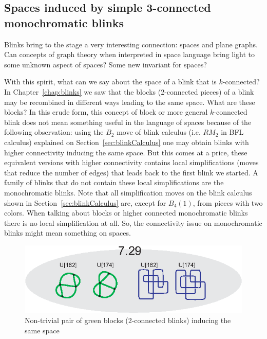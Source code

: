 \subsection{Spaces induced by simple 3-connected monochromatic blinks}

Blinks bring to the stage a very interesting connection: spaces and
plane graphs. Can concepts of graph theory when interpreted in space
language bring light to some unknown aspect of spaces? Some new
invariant for spaces?

With this spirit, what can we say about the space of a blink that is
$k$-connected? In Chapter~\ref{chap:blinks} we saw that the blocks
(2-connected pieces) of a blink may be recombined in different
ways leading to the same space. What are these blocks?
In this crude form, this concept of block or more general
$k$-connected blink does not mean something useful in
the language of spaces because of the following
observation: using the $B_2$ move of blink calculus
(i.e. $RM_2$ in BFL calculus) explained
on Section~\ref{sec:blinkCalculus} one
may obtain blinks with higher connectivity inducing
the same space. But this comes
at a price, these equivalent versions with higher
connectivity contains local simplifications (moves
that reduce the number of edges) that leads back to
the first blink we started. A family of blinks
that do not contain these local simplifications are the
monochromatic blinks. Note that all simplification moves
on the blink calculus shown in Section~\ref{sec:blinkCalculus}
are, except for $B_4(1)$, from pieces with two colors. When
talking about blocks or higher connected monochromatic
blinks there is no local simplification at all.
So, the connectivity issue on monochromatic blinks
might mean something on spaces.

\begin{figure}[htp]
   \begin{center}
      \leavevmode
      \includegraphics{A.figs/nontrivialgreenblocks.eps}
   \end{center}
   \vspace{-0.7cm}
   \caption{ Non-trivial pair of green blocks (2-connected blinks) inducing the same space}
   \label{fig:nonTrivialGreenBlocks}
\end{figure}

